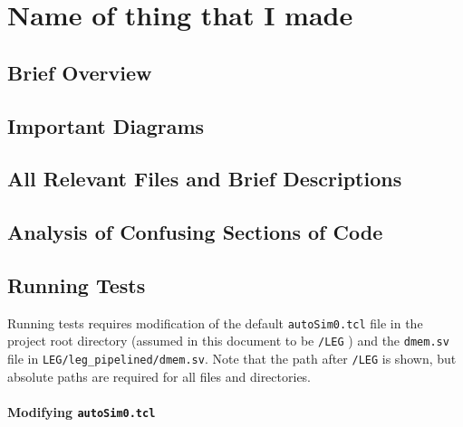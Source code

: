 \section{Name of thing that I made}

\subsection{Brief Overview}


\subsection{Important Diagrams}


\subsection{All Relevant Files and Brief Descriptions}


\subsection{Analysis of Confusing Sections of Code}


\subsection{Running Tests}

Running tests requires modification of the default \texttt{autoSim0.tcl} 
file in the project root directory (assumed in this document to be \texttt{/LEG} )
and the \texttt{dmem.sv} file in \texttt{LEG/leg\_pipelined/dmem.sv}. 
Note that the path after \texttt{/LEG} is shown, but absolute paths are 
required for all files and directories.
\\\\
\large \textbf{Modifying \texttt{autoSim0.tcl}}

